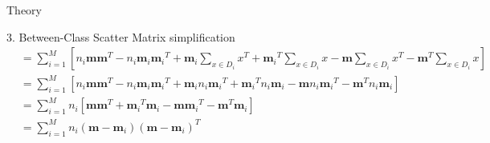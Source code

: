 \begin{section}{Theory}
\begin{homeworkSection}{3. Between-Class Scatter Matrix simplification}
{\begin{align*}
		&= \sum_{i=1}^M \left [ n_i \bm{m}\bm{m}^T - n_i \bm{m}_i {\bm{m}_i}^T + \bm{m}_i \sum_{x \in D_i} x^T + {\bm{m}_i}^T \sum_{x \in D_i} x - \bm{m} \sum_{x \in D_i} x^T - \bm{m}^T \sum_{x \in D_i} x \right ] \\
		&= \sum_{i=1}^M \left [ n_i \bm{m}\bm{m}^T - n_i \bm{m}_i {\bm{m}_i}^T + \bm{m}_i n_i {\bm{m}_i}^T + {\bm{m}_i}^T n_i {\bm{m}_i} - \bm{m} n_i {\bm{m}_i}^T - \bm{m}^T n_i {\bm{m}_i} \right ] \\
		&= \sum_{i=1}^M n_i \left [ \bm{m}\bm{m}^T + {\bm{m}_i}^T {\bm{m}_i} - \bm{m} {\bm{m}_i}^T - \bm{m}^T {\bm{m}_i} \right ] \\
		&= \sum_{i=1}^M n_i (\bm{m} - \bm{m}_i)(\bm{m} - \bm{m}_i)^T
		\\
	\end{align*}
}
\end{homeworkSection}

\end{section}

\newpage

